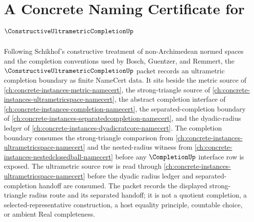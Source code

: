 \chapter{A Concrete Naming Certificate for $\ConstructiveUltrametricCompletionUp$}
\label{ch:concrete-instances-constructive-ultrametric-completion-namecert}

Following Schikhof's constructive treatment of non-Archimedean normed spaces and the completion conventions used by Bosch, Guentzer, and Remmert, the $\ConstructiveUltrametricCompletionUp$ packet records an ultrametric completion boundary as finite NameCert data. It sits beside the metric source of \autoref{ch:concrete-instances-metric-namecert}, the strong-triangle source of \autoref{ch:concrete-instances-ultrametricspace-namecert}, the abstract completion interface of \autoref{ch:concrete-instances-completion-namecert}, the separated-completion boundary of \autoref{ch:concrete-instances-separatedcompletion-namecert}, and the dyadic-radius ledger of \autoref{ch:concrete-instances-dyadicratcore-namecert}. The completion boundary consumes the strong-triangle comparison from \autoref{ch:concrete-instances-ultrametricspace-namecert} and the nested-radius witness from \autoref{ch:concrete-instances-nestedclosedball-namecert} before any $\CompletionUp$ interface row is exposed. The ultrametric source row is read through \autoref{ch:concrete-instances-ultrametricspace-namecert} before the dyadic radius ledger and separated-completion handoff are consumed. The packet records the displayed strong-triangle radius route and its separated handoff; it is not a quotient completion, a selected-representative construction, a host equality principle, countable choice, or ambient Real completeness.

